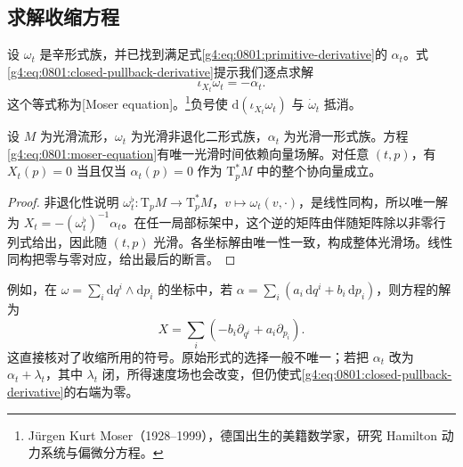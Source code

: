 \subsection{求解收缩方程}
\label{g4:subsec:0801:03}

设 \(\omega_t\) 是辛形式族，并已找到满足式\eqref{g4:eq:0801:primitive-derivative}的 \(\alpha_t\)。式\eqref{g4:eq:0801:closed-pullback-derivative}提示我们逐点求解
\begin{equation}\label{g4:eq:0801:moser-equation}
	\iota_{X_t}\omega_t=-\alpha_t.
\end{equation}
这个等式称为[Moser equation]。\footnote{Jürgen Kurt Moser（1928--1999），德国出生的美籍数学家，研究 Hamilton 动力系统与偏微分方程。}负号使 \(\mathrm{d}(\iota_{X_t}\omega_t)\) 与 \(\dot\omega_t\) 抵消。

\begin{lemma}\label{g4:lem:0801:contraction-solution}
	设 \(M\) 为光滑流形，\(\omega_t\) 为光滑非退化二形式族，\(\alpha_t\) 为光滑一形式族。方程\eqref{g4:eq:0801:moser-equation}有唯一光滑时间依赖向量场解。对任意 \((t,p)\)，有 \(X_t(p)=0\) 当且仅当 \(\alpha_t(p)=0\) 作为 \(\mathrm{T}_p^*M\) 中的整个协向量成立。
\end{lemma}
\begin{proof}
	非退化性说明 \(\omega_t^\flat:\mathrm{T}_pM\to\mathrm{T}_p^*M\)，\(v\mapsto\omega_t(v,\cdot)\)，是线性同构，所以唯一解为 \(X_t=-(\omega_t^\flat)^{-1}\alpha_t\)。在任一局部标架中，这个逆的矩阵由伴随矩阵除以非零行列式给出，因此随 \((t,p)\) 光滑。各坐标解由唯一性一致，构成整体光滑场。线性同构把零与零对应，给出最后的断言。
\end{proof}

例如，在 \(\omega=\sum_i\mathrm{d}q^i\wedge\mathrm{d}p_i\) 的坐标中，若 \(\alpha=\sum_i(a_i\,\mathrm{d}q^i+b_i\,\mathrm{d}p_i)\)，则方程的解为
\[
	X=\sum_i\left(-b_i\partial_{q^i}+a_i\partial_{p_i}\right).
\]
这直接核对了收缩所用的符号。原始形式的选择一般不唯一；若把 \(\alpha_t\) 改为 \(\alpha_t+\lambda_t\)，其中 \(\lambda_t\) 闭，所得速度场也会改变，但仍使式\eqref{g4:eq:0801:closed-pullback-derivative}的右端为零。

